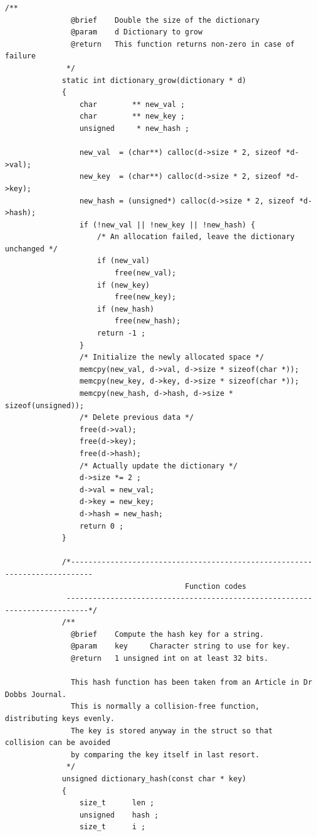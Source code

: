 \documentclass{article}
\begin{document}
\begin{Verbatim}[gobble=8]
             /**
               @brief    Double the size of the dictionary
               @param    d Dictionary to grow
               @return   This function returns non-zero in case of failure
              */
             static int dictionary_grow(dictionary * d)
             {
                 char        ** new_val ;
                 char        ** new_key ;
                 unsigned     * new_hash ;
             
                 new_val  = (char**) calloc(d->size * 2, sizeof *d->val);
                 new_key  = (char**) calloc(d->size * 2, sizeof *d->key);
                 new_hash = (unsigned*) calloc(d->size * 2, sizeof *d->hash);
                 if (!new_val || !new_key || !new_hash) {
                     /* An allocation failed, leave the dictionary unchanged */
                     if (new_val)
                         free(new_val);
                     if (new_key)
                         free(new_key);
                     if (new_hash)
                         free(new_hash);
                     return -1 ;
                 }
                 /* Initialize the newly allocated space */
                 memcpy(new_val, d->val, d->size * sizeof(char *));
                 memcpy(new_key, d->key, d->size * sizeof(char *));
                 memcpy(new_hash, d->hash, d->size * sizeof(unsigned));
                 /* Delete previous data */
                 free(d->val);
                 free(d->key);
                 free(d->hash);
                 /* Actually update the dictionary */
                 d->size *= 2 ;
                 d->val = new_val;
                 d->key = new_key;
                 d->hash = new_hash;
                 return 0 ;
             }
             
             /*---------------------------------------------------------------------------
                                         Function codes
              ---------------------------------------------------------------------------*/
             /**
               @brief    Compute the hash key for a string.
               @param    key     Character string to use for key.
               @return   1 unsigned int on at least 32 bits.
             
               This hash function has been taken from an Article in Dr Dobbs Journal.
               This is normally a collision-free function, distributing keys evenly.
               The key is stored anyway in the struct so that collision can be avoided
               by comparing the key itself in last resort.
              */
             unsigned dictionary_hash(const char * key)
             {
                 size_t      len ;
                 unsigned    hash ;
                 size_t      i ;
             

\end{Verbatim}
\end{document}
